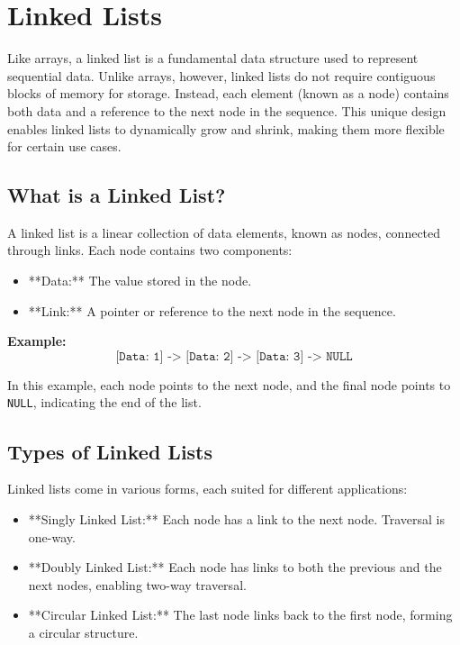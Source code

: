 
\chapter{Linked Lists}
\label{chap:Linked_Lists}

Like arrays, a linked list is a fundamental data structure used to represent sequential data. Unlike arrays, however, linked lists do not require contiguous blocks of memory for storage. Instead, each element (known as a node) contains both data and a reference to the next node in the sequence. This unique design enables linked lists to dynamically grow and shrink, making them more flexible for certain use cases.

\section*{What is a Linked List?}
A linked list is a linear collection of data elements, known as nodes, connected through links. Each node contains two components:
\begin{itemize}
    \item **Data:** The value stored in the node.
    \item **Link:** A pointer or reference to the next node in the sequence.
\end{itemize}

\textbf{Example:}
\[
\texttt{[Data: 1] -> [Data: 2] -> [Data: 3] -> NULL}
\]

In this example, each node points to the next node, and the final node points to \texttt{NULL}, indicating the end of the list.



\section*{Types of Linked Lists}
Linked lists come in various forms, each suited for different applications:
\begin{itemize}
    \item **Singly Linked List:** Each node has a link to the next node. Traversal is one-way.
    \item **Doubly Linked List:** Each node has links to both the previous and the next nodes, enabling two-way traversal.
    \item **Circular Linked List:** The last node links back to the first node, forming a circular structure.
\end{itemize}



